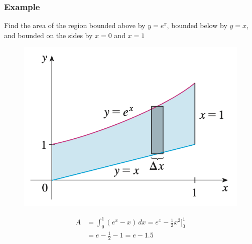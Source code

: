 \documentclass[t]{beamer}
\theoremstyle{plain}
\theoremstyle{definition}
\begin{document}
\begin{frame}

\frametitle{Example}

Find the area of the region bounded above by $y = e^x$,  bounded below by
$y = x$,  and bounded on the sides by $x = 0$ and $x = 1$

\begin{figure}[t]
\begin{center}
\includegraphics[scale=0.5]{fig/area1}
\end{center}
\end{figure}

\vspace{-2em}

\begin{align*}
A &= \int_{0}^{1} (e^x - x) \, dx = e^x - \frac{1}{2}x^2 \big]_{0}^{1}\\
   &= e - \frac{1}{2} - 1 = e - 1.5
\end{align*}

\end{frame}
\end{document}
